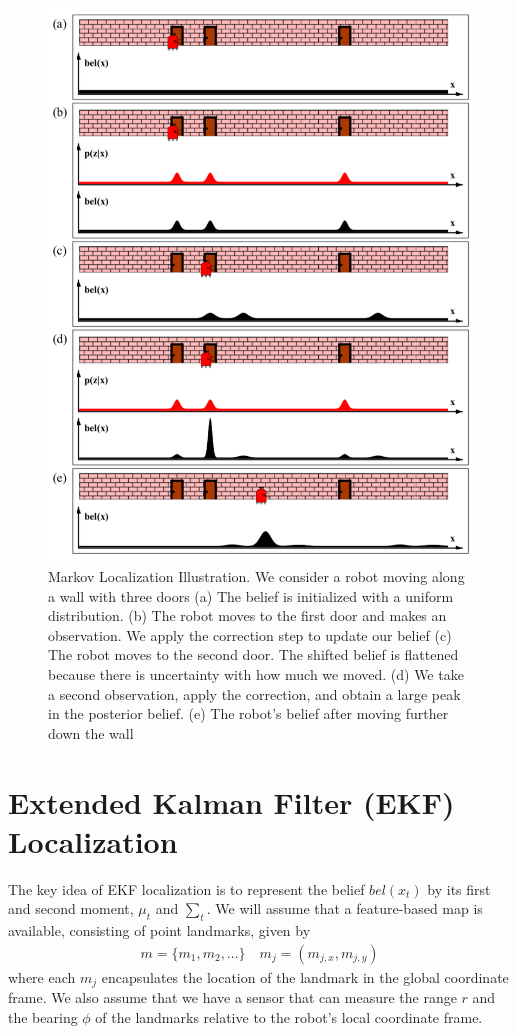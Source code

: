 \documentclass[twoside]{article}
\begin{document}
\begin{figure}[H]
\centering
\includegraphics[width=.8\linewidth]{MarkovLocalizationPic.png}
\caption{Markov Localization Illustration. We consider a robot moving along a wall with three doors (a) The belief is initialized with a uniform distribution. (b) The robot moves to the first door and makes an observation. We apply the correction step to update our belief (c) The robot moves to the second door. The shifted belief is flattened because there is uncertainty with how much we moved. (d) We take a second observation, apply the correction, and obtain a large peak in the posterior belief. (e) The robot’s belief after moving further down the wall}
\label{fig:MarkovLocalizationPic}
\end{figure}

\section{Extended Kalman Filter (EKF) Localization}
The key idea of EKF localization is to represent the belief $bel(x_t)$ by its first and second moment, $\mu_t$ and
$\sum_t$. We will assume that a feature-based map is available, consisting of point landmarks, given by
\begin{align}
    m = \{m_1, m_2, \hdots\} \quad m_j = (m_{j,x}, m_{j,y})
\end{align}
where each $m_j$ encapsulates the location of the landmark in the global coordinate frame. We also assume
that we have a sensor that can measure the range $r$ and the bearing $\phi$ of the landmarks relative to the
robot’s local coordinate frame.
\end{document}
